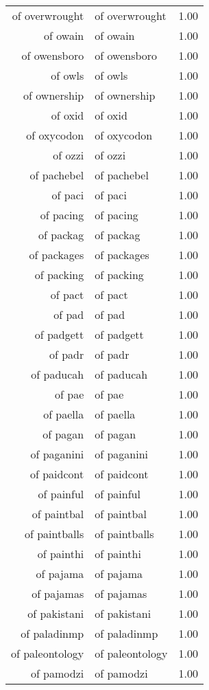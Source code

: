 \begin{table}[ht]
\begin{tabular}{rlr}
  of overwrought & of overwrought & 1.00 \\ 
  of owain & of owain & 1.00 \\ 
  of owensboro & of owensboro & 1.00 \\ 
  of owls & of owls & 1.00 \\ 
  of ownership & of ownership & 1.00 \\ 
  of oxid & of oxid & 1.00 \\ 
  of oxycodon & of oxycodon & 1.00 \\ 
  of ozzi & of ozzi & 1.00 \\ 
  of pachebel & of pachebel & 1.00 \\ 
  of paci & of paci & 1.00 \\ 
  of pacing & of pacing & 1.00 \\ 
  of packag & of packag & 1.00 \\ 
  of packages & of packages & 1.00 \\ 
  of packing & of packing & 1.00 \\ 
  of pact & of pact & 1.00 \\ 
  of pad & of pad & 1.00 \\ 
  of padgett & of padgett & 1.00 \\ 
  of padr & of padr & 1.00 \\ 
  of paducah & of paducah & 1.00 \\ 
  of pae & of pae & 1.00 \\ 
  of paella & of paella & 1.00 \\ 
  of pagan & of pagan & 1.00 \\ 
  of paganini & of paganini & 1.00 \\ 
  of paidcont & of paidcont & 1.00 \\ 
  of painful & of painful & 1.00 \\ 
  of paintbal & of paintbal & 1.00 \\ 
  of paintballs & of paintballs & 1.00 \\ 
  of painthi & of painthi & 1.00 \\ 
  of pajama & of pajama & 1.00 \\ 
  of pajamas & of pajamas & 1.00 \\ 
  of pakistani & of pakistani & 1.00 \\ 
  of paladinmp & of paladinmp & 1.00 \\ 
  of paleontology & of paleontology & 1.00 \\ 
  of pamodzi & of pamodzi & 1.00 \\ 

\end{tabular}
\end{table}
